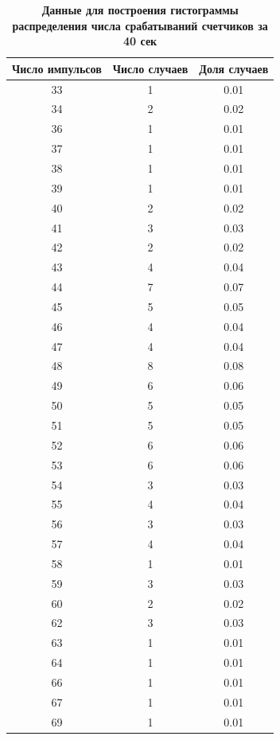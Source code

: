 \documentclass[a4paper, 12pt]{article}
\begin{document}
\begin{table}
\caption{\textbf{ Данные для построения гистограммы распределения числа срабатываний счетчиков за 40 сек}}
\begin{tabular}{|c|c|c|}
\hline 
Число импульсов & Число случаев & Доля случаев \\ 
\hline 
33 & 1 & 0.01 \\ 
\hline 
34 & 2 & 0.02 \\ 
\hline
36 & 1 & 0.01 \\
\hline 
37 & 1 & 0.01 \\ 
\hline 
38 & 1 & 0.01 \\ 
\hline 
39 & 1 & 0.01 \\ 
\hline 
40 & 2 & 0.02 \\ 
\hline 
41 & 3 & 0.03 \\ 
\hline 
42 & 2 & 0.02 \\ 
\hline 
43 & 4 & 0.04 \\ 
\hline 
44 & 7 & 0.07 \\ 
\hline 
45 & 5 & 0.05 \\ 
\hline 
46 & 4 & 0.04 \\ 
\hline 
47 & 4 & 0.04 \\ 
\hline 
48 & 8 & 0.08 \\ 
\hline 
49 & 6 & 0.06 \\ 
\hline 
50 & 5 & 0.05 \\ 
\hline 
51 & 5 & 0.05 \\ 
\hline 
52 & 6 & 0.06 \\ 
\hline 
53 & 6 & 0.06 \\ 
\hline 
54 & 3 & 0.03 \\ 
\hline 
55 & 4 & 0.04 \\ 
\hline 
56 & 3 & 0.03 \\ 
\hline 
57 & 4 & 0.04 \\ 
\hline 
58 & 1 & 0.01 \\ 
\hline 
59 & 3 & 0.03 \\ 
\hline 
60 & 2 & 0.02 \\  
\hline 
62 & 3 & 0.03 \\ 
\hline 
63 & 1 & 0.01 \\ 
\hline 
64 & 1 & 0.01 \\ 
\hline 
66 & 1 & 0.01 \\ 
\hline 
67 & 1 & 0.01 \\ 
\hline  
69 & 1 & 0.01 \\ 
\hline 
\end{tabular}
\end{table}
\end{document}
